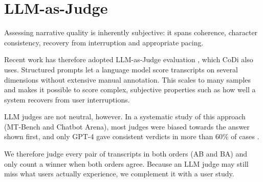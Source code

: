 \section{LLM-as-Judge}

Assessing narrative quality is inherently subjective: it spans coherence, character consistency, recovery from interruption and appropriate pacing.

Recent work has therefore adopted LLM-as-Judge evaluation \cite{zheng2023judging}, which CoDi \cite{kim2025codi} also uses. Structured prompts let a language model score transcripts on several dimensions without extensive manual annotation. This scales to many samples and makes it possible to score complex, subjective properties such as how well a system recovers from user interruptions.

LLM judges are not neutral, however. In a systematic study of this approach (MT-Bench and Chatbot Arena), most judges were biased towards the answer shown first, and only GPT-4 gave consistent verdicts in more than 60\% of cases \cite{zheng2023judging}.

We therefore judge every pair of transcripts in both orders (AB and BA) and only count a winner when both orders agree. Because an LLM judge may still miss what users actually experience, we complement it with a user study. 

